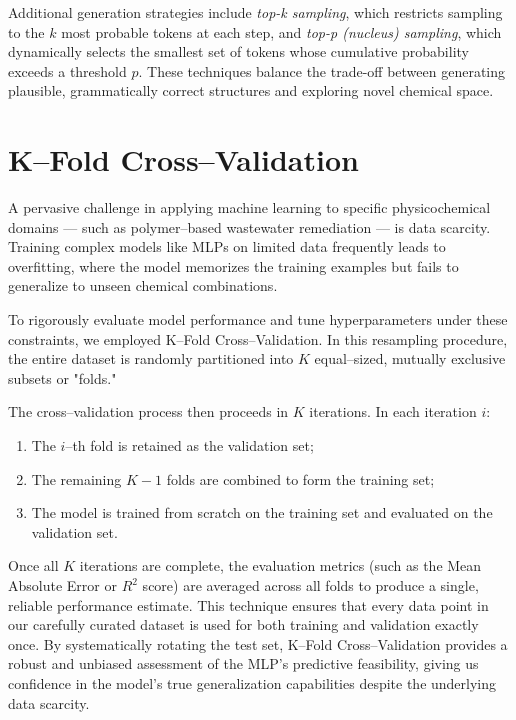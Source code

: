 Additional generation strategies include \emph{top-k sampling}, which restricts sampling to the $k$ most probable tokens at each step, and \emph{top-p (nucleus) sampling}, which dynamically selects the smallest set of tokens whose cumulative probability exceeds a threshold $p$. These techniques balance the trade-off between generating plausible, grammatically correct structures and exploring novel chemical space.

\section{K--Fold Cross--Validation}
\label{sec:kfold}

A pervasive challenge in applying machine learning to specific physicochemical domains — such as polymer--based wastewater remediation — is data scarcity. Training complex models like MLPs on limited data frequently leads to overfitting, where the model memorizes the training examples but fails to generalize to unseen chemical combinations.

To rigorously evaluate model performance and tune hyperparameters under these constraints, we employed K--Fold Cross--Validation.  In this resampling procedure, the entire dataset is randomly partitioned into $K$ equal--sized, mutually exclusive subsets or "folds."

The cross--validation process then proceeds in $K$ iterations. In each iteration $i$:
\begin{enumerate}
	\item The $i$--th fold is retained as the validation set;
	\item The remaining $K-1$ folds are combined to form the training set;
	\item The model is trained from scratch on the training set and evaluated on the validation set.
\end{enumerate}

Once all $K$ iterations are complete, the evaluation metrics (such as the Mean Absolute Error or $R^2$ score) are averaged across all folds to produce a single, reliable performance estimate. This technique ensures that every data point in our carefully curated dataset is used for both training and validation exactly once. By systematically rotating the test set, K--Fold Cross--Validation provides a robust and unbiased assessment of the MLP's predictive feasibility, giving us confidence in the model's true generalization capabilities despite the underlying data scarcity.
